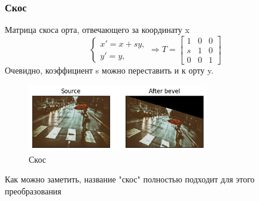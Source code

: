 \documentclass[a4paper,12pt]{article}
\begin{document}
\subsubsection{Скос}
Матрица скоса орта, отвечающего за координату x
$$
	\begin{cases}
		x'=x+sy, \\
		y'=y,
	\end{cases}
	\Rightarrow
	T=
	\begin{bmatrix}
		1 & 0 & 0
		\\ s & 1 & 0
		\\ 0 & 0 & 1
	\end{bmatrix}
$$
Очевидно, коэффициент s можно переставить и к орту y.
\begin{figure}[H]
    \centering \includegraphics[width=0.7\textwidth]{my_images/25.png}
    \caption{Скос}
\end{figure}
Как можно заметить, название "скос" полностью подходит для этого преобразования
\end{document}
